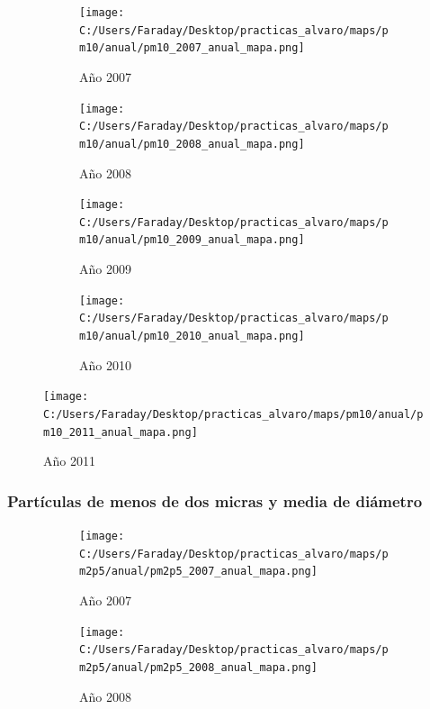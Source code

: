 \documentclass[12pt]{article}
\begin{document}
\begin{figure}[H]
\centering
\begin{subfigure}[h]{0.45\textwidth}
\texttt{[image: C:/Users/Faraday/Desktop/practicas\_alvaro/maps/pm10/anual/pm10\_2007\_anual\_mapa.png]}
\caption{Año 2007}
\label{fig:map-ann-3-1}
\end{subfigure}
%
\begin{subfigure}[H]{0.45\textwidth}
\texttt{[image: C:/Users/Faraday/Desktop/practicas\_alvaro/maps/pm10/anual/pm10\_2008\_anual\_mapa.png]}
\caption{Año 2008}
\label{fig:map-ann-3-2}
\end{subfigure}
\caption{}
\end{figure}

\begin{figure}[H]
\centering
\begin{subfigure}[h]{0.45\textwidth}
\texttt{[image: C:/Users/Faraday/Desktop/practicas\_alvaro/maps/pm10/anual/pm10\_2009\_anual\_mapa.png]}
\caption{Año 2009}
\label{fig:map-ann-3-3}
\end{subfigure}
%
\begin{subfigure}[H]{0.45\textwidth}
\texttt{[image: C:/Users/Faraday/Desktop/practicas\_alvaro/maps/pm10/anual/pm10\_2010\_anual\_mapa.png]}
\caption{Año 2010}
\label{fig:map-ann-3-4}
\end{subfigure}
\caption{}
\end{figure}

\begin{figure}[H]
\centering
\texttt{[image: C:/Users/Faraday/Desktop/practicas\_alvaro/maps/pm10/anual/pm10\_2011\_anual\_mapa.png]}
\caption{Año 2011}
\label{fig:map-ann-3-5}
\end{figure}

\newpage

\subsubsection*{Partículas de menos de dos micras y media de diámetro}
%

\begin{figure}[H]
\centering
\begin{subfigure}[h]{0.45\textwidth}
\texttt{[image: C:/Users/Faraday/Desktop/practicas\_alvaro/maps/pm2p5/anual/pm2p5\_2007\_anual\_mapa.png]}
\caption{Año 2007}
\label{fig:map-ann-4-1}
\end{subfigure}
%
\begin{subfigure}[H]{0.45\textwidth}
\texttt{[image: C:/Users/Faraday/Desktop/practicas\_alvaro/maps/pm2p5/anual/pm2p5\_2008\_anual\_mapa.png]}
\caption{Año 2008}
\label{fig:map-ann-4-2}
\end{subfigure}
\caption{}
\end{figure}
\end{document}
